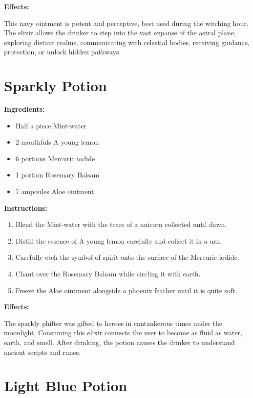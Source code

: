 \documentclass{article}
\begin{document}
\textbf{Effects:}

This navy ointment is potent and perceptive, best used during the witching hour. The elixir allows the drinker to step into the vast expanse of the astral plane, exploring distant realms, communicating with celestial bodies, receiving guidance, protection, or unlock hidden pathways.

\newpage
\section*{Sparkly Potion}

\textbf{Ingredients:}

\begin{itemize}
  \item Half a piece Mint-water
  \item 2 mouthfuls A young lemon
  \item 6 portions Mercuric iodide
  \item 1 portion Rosemary Balsam
  \item 7 ampoules Aloe ointment
\end{itemize}

\textbf{Instructions:}

\begin{enumerate}
  \item Blend the Mint-water with the tears of a unicorn collected until dawn.
  \item Distill the essence of A young lemon carefully and collect it in a urn.
  \item Carefully etch the symbol of spirit onto the surface of the Mercuric iodide.
  \item Chant over the Rosemary Balsam while circling it with earth.
  \item Freeze the Aloe ointment alongside a phoenix feather until it is quite soft.
\end{enumerate}

\textbf{Effects:}

The sparkly philter was gifted to heroes in cantankerous times under the moonlight. Consuming this elixir connects the user to become as fluid as water, earth, and smell. After drinking, the potion causes the drinker to understand ancient scripts and runes.

\newpage
\section*{Light Blue Potion}
\end{document}
